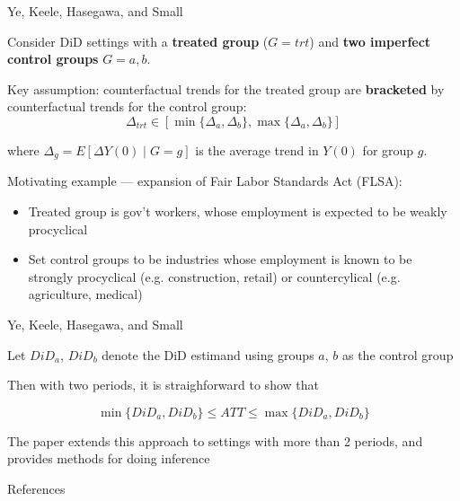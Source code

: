\documentclass[aspectratio = 169, 13pt]{beamer}
\begin{document}
\begin{frame}[label = yeetal]{Ye, Keele, Hasegawa, and Small }
	\begin{wideitemize}
		\item
		Consider DiD settings with a \textbf{treated group} ($G=trt$) and \textbf{two imperfect control groups} $G = a,b$. 
		
		\item
		Key assumption: counterfactual trends for the treated group are \textbf{bracketed} by counterfactual trends for the control group:
		$$\Delta_{trt} \in [\min\{\Delta_a, \Delta_b\}, \max\{ \Delta_a, \Delta_b  \}]$$
		
		\noindent where $\Delta_g = E[ \Delta Y(0) \mid G = g]$ is the average trend in $Y(0)$ for group $g$.
		
		\item
		Motivating example --- expansion of Fair Labor Standards Act (FLSA):
		\begin{itemize}
			\item
			Treated group is gov't workers, whose employment is expected to be weakly procyclical
			
			\item
			Set control groups to be industries whose employment is known to be strongly procyclical (e.g. construction, retail) or countercylical (e.g. agriculture, medical)
		\end{itemize}
		
		
	\end{wideitemize}
\end{frame}

\begin{frame}{Ye, Keele, Hasegawa, and Small }
	\begin{wideitemize}
		\item
		Let $DiD_a$, $DiD_b$ denote the DiD estimand using groups $a$, $b$ as the control group
		
		\item
		Then with two periods, it is straighforward to show that 
		
		$$\min\{DiD_a, DiD_b \} \leq ATT \leq \max\{DiD_a, DiD_b \} $$
		
		\item
		The paper extends this approach to settings with more than 2 periods, and provides methods for doing inference
	\end{wideitemize}
\end{frame}

\nocite{rambachan_more_2023}

\begin{frame}{References}
	
\end{frame}
\end{document}

